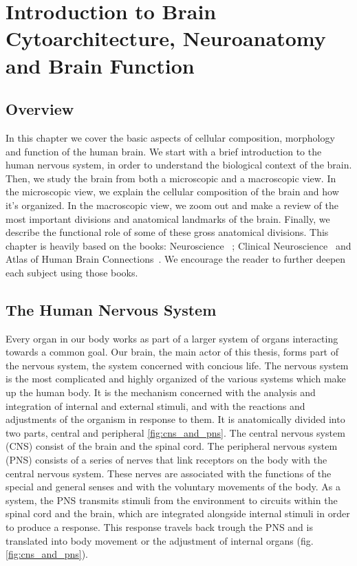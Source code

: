 
\chapter{Introduction to Brain Cytoarchitecture, Neuroanatomy and Brain Function}
\label{ch:intro_anato}

\section{Overview}
In this chapter we cover the basic aspects of cellular composition, morphology
and function of the human brain. We start with a brief introduction to the
human nervous system, in order to understand the biological context of the brain.
Then, we study the brain from both a microscopic and a macroscopic view. In the
microscopic view, we explain the cellular composition of the brain and how it’s
organized. In the macroscopic view, we zoom out and make a review of the most 
important divisions and anatomical landmarks of the brain. Finally, we describe
the functional role of some of these gross anatomical divisions. This chapter is
heavily based on the books: Neuroscience~\cite{Purves2004} ; Clinical
Neuroscience~\cite{Johns} and Atlas of Human Brain Connections~\cite{Catani2012}.
We encourage the reader to further deepen each subject using those books.

\section{The Human Nervous System}
Every organ in our body works as part of a larger system of organs interacting
towards a common goal. Our brain, the main actor of this thesis,
forms part of the nervous system, the system concerned with concious life.
The nervous system is the most complicated and highly organized of the various
systems which make up the human body\cite{Gray1918}. It is the mechanism
concerned with the analysis and integration of internal and external stimuli,
and with the reactions and adjustments of the organism in response to them. It
is anatomically divided into two parts, central and peripheral \ref{fig:cns_and_pns}.
The central nervous system (CNS) consist of the brain and the spinal cord. The
peripheral nervous system (PNS) consists of a series of nerves that link
receptors on the body with the central nervous system. These nerves are
associated with the functions of the special and general senses and with the
voluntary movements of the body. As a system, the PNS transmits stimuli from
the environment to circuits within the spinal cord and the brain, which are
integrated alongside internal stimuli in order to produce a response. This
response travels back trough the PNS and is translated into body movement or
the adjustment of internal organs (fig. \ref{fig:cns_and_pns}). 

